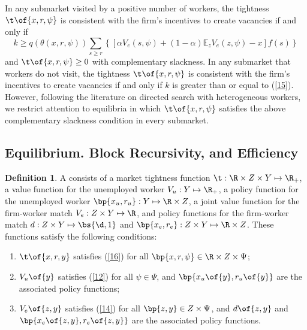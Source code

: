 \documentclass[12pt]{article}
\newcommand{\highlightB}[1]{{\emph{\color{MyBlue}{#1}}}}
\theoremstyle{definition}
\newtheorem{definition}{Definition}
\begin{document}
In any submarket visited by a positive number of workers, the tightness $\t\of{x, r, \psi}$ is consistent with the firm's incentives to create vacancies if and only if 
\begin{equation}
    \label{16}
    k \geq q(\theta(x, r, \psi)) \sum_{s \geq r}\left\{\left[\alpha V_e(s, \psi)+(1-\alpha) \mathbb{E}_z V_e(z, \psi)-x\right] f(s)\right\}
\end{equation}
and $\t\of{x, r, \psi} \geq 0$ with complementary slackness. In any submarket that workers do not visit, the tightness $\t\of{x, r, \psi}$ is consistent with the firm's incentives to create vacancies if and only if $k$ is greater than or equal to (\ref{15}). However, following the literature on directed search with heterogeneous workers, we restrict attention to equilibria in which $\t\of{x, r, \psi}$ satisfies the above complementary slackness condition in every submarket. 

\subsection{Equilibrium. Block Recursivity, and Efficiency}

\begin{definition}
    A \highlightB{block-recursive equilibrium (BRE)} consists of a market tightness function $\t: \R \times Z \times Y \mapsto \R_+$, a value function for the unemployed worker $V_u: Y \mapsto \R_+$, a policy function for the unemployed worker $\bp{x_u, r_u}: Y \mapsto \R \times Z$, a joint value function for the firm-worker match $V_e: Z \times Y \mapsto \R$, and policy functions for the firm-worker match $d: Z \times Y \mapsto \bs{\d, 1}$ and $\bp{x_e, r_e}: Z \times Y \mapsto \R \times Z$. These functions satisfy the following conditions:
    \begin{enumerate}[topsep=0pt, leftmargin=20pt, itemsep=0pt, label=(\roman*)]
        \setlength{\parskip}{10pt} 
        \item $\t\of{x, r, y}$ satisfies (\ref{16}) for all $\bp{x, r, \psi} \in \R \times Z \times \Psi$;
        \item $V_u\of{y}$ satisfies (\ref{12}) for all $\psi \in \Psi$, and $\bp{x_u\of{y}, r_u\of{y}}$ are the associated policy functions; 
        \item $V_e\of{z, y}$ satisfies (\ref{14}) for all $\bp{z, y} \in Z \times \Psi$, and $d\of{z, y}$ and $\bp{x_e\of{z,y}, r_e\of{z,y}}$ are the associated policy functions.
    \end{enumerate}
\end{definition}
\end{document}
